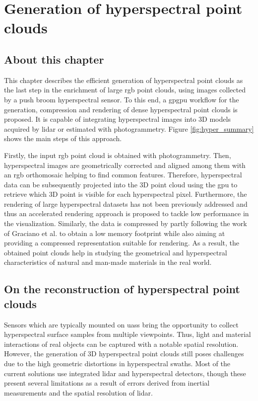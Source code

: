 \setchapterpreamble[u]{\margintoc}
\chapter{Generation of hyperspectral point clouds}
\label{sec:hyperspectral_point_clouds}

\section*{About this chapter}

This chapter describes the efficient generation of hyperspectral point clouds as the last step in the enrichment of large \acrshort{rgb} point clouds, using images collected by a push broom hyperspectral sensor. To this end, a \acrshort{gpgpu} workflow for the generation, compression and rendering of dense hyperspectral point clouds is proposed. It is capable of integrating hyperspectral images into 3D models acquired by \acrshort{lidar} or estimated with photogrammetry. Figure \ref{fig:hyper_summary} shows the main steps of this approach.

Firstly, the input \acrshort{rgb} point cloud is obtained with photogrammetry. Then, hyperspectral images are geometrically corrected and aligned among them with an \acrshort{rgb} orthomosaic helping to find common features. Therefore, hyperspectral data can be subsequently projected into the 3D point cloud using the \acrshort{gpu} to retrieve which 3D point is visible for each hyperspectral pixel. Furthermore, the rendering of large hyperspectral datasets has not been previously addressed and thus an accelerated rendering approach is proposed to tackle low performance in the visualization. Similarly, the data is compressed by partly following the work of Graciano et al. \cite{graciano_quadstack_2021} to obtain a low memory footprint while also aiming at providing a compressed representation suitable for rendering. As a result, the obtained point clouds help in studying the geometrical and hyperspectral characteristics of natural and man-made materials in the real world.

\section{On the reconstruction of hyperspectral point clouds}

Sensors which are typically mounted on \acrshort{uas}s bring the opportunity to collect hyperspectral surface samples from multiple viewpoints. Thus, light and material interactions of real objects can be captured with a notable spatial resolution. However, the generation of 3D hyperspectral point clouds still poses challenges due to the high geometric distortions in hyperspectral swaths. Most of the current solutions use integrated \acrshort{lidar} and hyperspectral detectors, though these present several limitations as a result of errors derived from inertial measurements and the spatial resolution of \acrshort{lidar}. 

